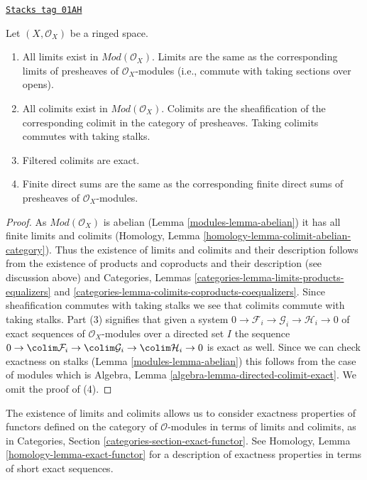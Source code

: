 \begin{lemma}
\label{modules-lemma-limits-colimits}
\href{https://stacks.math.columbia.edu/tag/01AH}{\texttt{Stacks tag 01AH}}

Let $(X, \mathcal{O}_X)$ be a ringed space.
\begin{enumerate}
\item All limits exist in $\textit{Mod}(\mathcal{O}_X)$.
Limits are the same as the corresponding limits of presheaves of
$\mathcal{O}_X$-modules (i.e., commute with taking
sections over opens).
\item All colimits exist in $\textit{Mod}(\mathcal{O}_X)$.
Colimits are the sheafification of the corresponding colimit in
the category of presheaves. Taking colimits commutes with taking
stalks.
\item Filtered colimits are exact.
\item Finite direct sums are the same as the corresponding
finite direct sums of presheaves of $\mathcal{O}_X$-modules.
\end{enumerate}
\end{lemma}

\begin{proof}

As $\textit{Mod}(\mathcal{O}_X)$ is abelian (Lemma \ref{modules-lemma-abelian})
it has all finite limits and colimits
(Homology, Lemma \ref{homology-lemma-colimit-abelian-category}).
Thus the existence of limits and colimits and their description follows from
the existence of products and coproducts and their description
(see discussion above) and
Categories, Lemmas \ref{categories-lemma-limits-products-equalizers} and
\ref{categories-lemma-colimits-coproducts-coequalizers}.
Since sheafification commutes with taking stalks we see that
colimits commute with taking stalks. Part (3) signifies that given
a system $0 \to \mathcal{F}_i \to \mathcal{G}_i \to \mathcal{H}_i \to 0$
of exact sequences of $\mathcal{O}_X$-modules over a directed set $I$
the sequence $0 \to \colim \mathcal{F}_i \to \colim \mathcal{G}_i \to
\colim \mathcal{H}_i \to 0$ is exact as well. Since we can check
exactness on stalks (Lemma \ref{modules-lemma-abelian}) this follows from the case
of modules which is
Algebra, Lemma \ref{algebra-lemma-directed-colimit-exact}.
We omit the proof of (4).
\end{proof}

The existence of limits and colimits
allows us to consider exactness properties of
functors defined on the category of $\mathcal{O}$-modules
in terms of limits and colimits, as in
Categories, Section \ref{categories-section-exact-functor}.
See Homology, Lemma \ref{homology-lemma-exact-functor} for a
description of exactness
properties in terms of short exact sequences.

